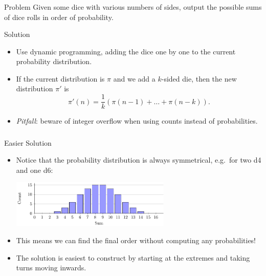 \begin{frame}
  \frametitle{\problemtitle}
  \begin{block}{Problem}
    Given some dice with various numbers of sides, output the possible sums of dice rolls in order of probability.
  \end{block}
  \pause
  \begin{block}{Solution}
    \begin{itemize}
      \item Use dynamic programming, adding the dice one by one to the current probability distribution.
      \item If the current distribution is $\pi$ and we add a $k$-sided die, then the new distribution $\pi'$ is
        \[ \pi'(n) = \frac{1}{k}(\pi(n-1) + \dots + \pi(n-k)). \]
      \item \emph{Pitfall}: beware of integer overflow when using counts instead of probabilities.
    \end{itemize}
  \end{block}
\end{frame}
\begin{frame}
  \frametitle{\problemtitle}
  \begin{block}{Easier Solution}
    \begin{itemize}
      \item Notice that the probability distribution is always symmetrical, e.g.\ for two d4 and one d6:
        \begin{center}
          \includegraphics[width=0.6\textwidth]{histogram}
        \end{center}
      \item This means we can find the final order without computing any probabilities!
      \item The solution is easiest to construct by starting at the extremes and taking turns moving inwards.
    \end{itemize}
  \end{block}
\end{frame}
